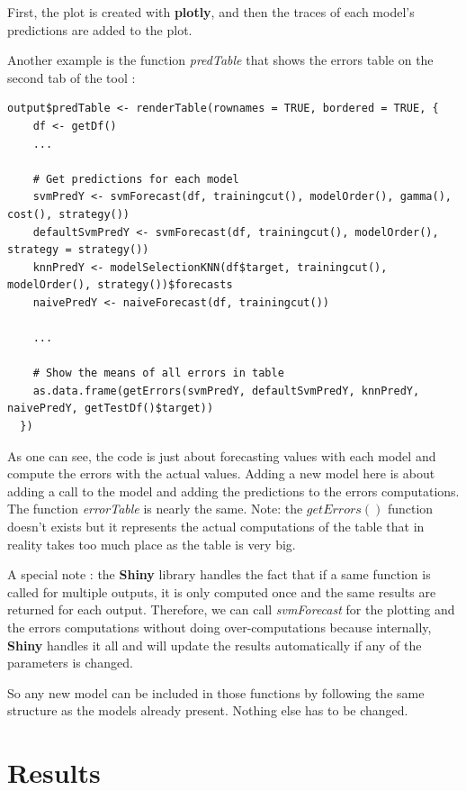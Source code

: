 \documentclass[11pt,a4paper,oneside]{book}
\begin{document}
First, the plot is created with \textbf{plotly}, and then the traces of each model's predictions are added to the plot. 

Another example is the function \textit{predTable} that shows the errors table on the second tab of the tool : \\

\begin{lstlisting}
output$predTable <- renderTable(rownames = TRUE, bordered = TRUE, {
    df <- getDf()
    ...
    
    # Get predictions for each model
    svmPredY <- svmForecast(df, trainingcut(), modelOrder(), gamma(), cost(), strategy())
    defaultSvmPredY <- svmForecast(df, trainingcut(), modelOrder(), strategy = strategy())
    knnPredY <- modelSelectionKNN(df$target, trainingcut(), modelOrder(), strategy())$forecasts
    naivePredY <- naiveForecast(df, trainingcut())

    ...
    
    # Show the means of all errors in table
    as.data.frame(getErrors(svmPredY, defaultSvmPredY, knnPredY, naivePredY, getTestDf()$target))
  })
\end{lstlisting}  
  
As one can see, the code is just about forecasting values with each model and compute the errors with the actual values. Adding a new model here is about adding a call to the model and adding the predictions to the errors computations. The function \textit{errorTable} is nearly the same. Note: the $getErrors()$ function doesn't exists but it represents the actual computations of the table that in reality takes too much place as the table is very big. 

A special note : the \textbf{Shiny} library handles the fact that if a same function is called for multiple outputs, it is only computed once and the same results are returned for each output. Therefore, we can call \textit{svmForecast} for the plotting and the errors computations without doing over-computations because internally, \textbf{Shiny} handles it all and will update the results automatically if any of the parameters is changed.

So any new model can be included in those functions by following the same structure as the models already present. Nothing else has to be changed.


\chapter{Results}
\end{document}
